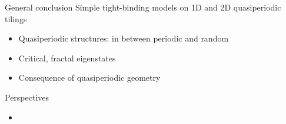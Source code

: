 \begin{frame}{General conclusion}
Simple tight-binding models on 1D and 2D quasiperiodic tilings
\begin{itemize}
	\item Quasiperiodic structures: in between periodic and random
	\item Critical, fractal eigenstates
	\item Consequence of quasiperiodic geometry
\end{itemize}
Perspectives
\begin{itemize}
	\item
\end{itemize}
\end{frame}